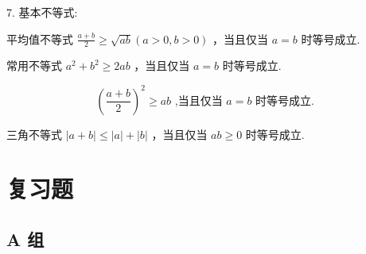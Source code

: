 \documentclass[a4paper,10pt,oneside,fontset=none]{ctexbook}
\renewcommand{\geq}{\geqslant}
\renewcommand{\leq}{\leqslant}
\numberwithin{equation}{chapter}
\begin{document}
7. 基本不等式:

平均值不等式 $\frac{a + b}{2} \geq  \sqrt{ab}\left( {a > 0, b > 0}\right)$ ，当且仅当 $a = b$ 时等号成立.

常用不等式 ${a}^{2} + {b}^{2} \geq  {2ab}$ ，当且仅当 $a = b$ 时等号成立.

$$
{\left( \frac{a + b}{2}\right) }^{2} \geq  {ab}\text{ ,当且仅当 }a = b\text{ 时等号成立. }
$$

三角不等式 $\left| {a + b}\right|  \leq  \left| a\right|  + \left| b\right|$ ，当且仅当 ${ab} \geq  0$ 时等号成立.

\section*{复习题}

\subsection*{A 组}
\end{document}
